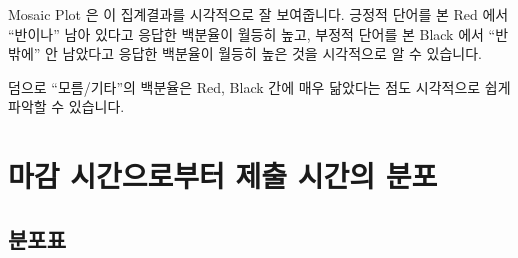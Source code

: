 \documentclass[
]{book}
\begin{document}
Mosaic Plot 은 이 집계결과를 시각적으로 잘 보여줍니다. 긍정적 단어를 본 Red 에서 ``반이나'' 남아 있다고 응답한 백분율이 월등히 높고, 부정적 단어를 본 Black 에서 ``반 밖에'' 안 남았다고 응답한 백분율이 월등히 높은 것을 시각적으로 알 수 있습니다.

덤으로 ``모름/기타''의 백분율은 Red, Black 간에 매우 닮았다는 점도 시각적으로 쉽게 파악할 수 있습니다.

\section{마감 시간으로부터 제출 시간의 분포}\label{uxb9c8uxac10-uxc2dcuxac04uxc73cuxb85cuxbd80uxd130-uxc81cuxcd9c-uxc2dcuxac04uxc758-uxbd84uxd3ec-4}

\subsection{분포표}\label{uxbd84uxd3ecuxd45c-4}
\end{document}
